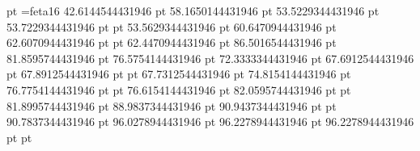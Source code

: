{{  { pt \vrule width 351.385545556806 pt depth 0.2 pt height 0.2 pt  }%
  \font\lilyfontA=feta16\lilyfontA\placebox{-20.0 pt }%
  {42.6144544431946 pt }%
  { }%
  \placebox{-24.0 pt }%
  {58.1650144431946 pt }%
  {%
   }%
  \placebox{-27.264 pt }%
  {53.5229344431946 pt }%
  {%
   }%
  \placebox{-16.0 pt }%
  {53.7229344431946 pt }%
  { pt \vrule width 0.32 pt depth 11.264 pt height 1.03836152344995 pt  }%
  \placebox{-14.0 pt }%
  {53.5629344431946 pt }%
  { }%
  \placebox{-14.0 pt }%
  {60.6470944431946 pt }%
  { }%
  \placebox{-16.0 pt }%
  {62.6070944431946 pt }%
  { pt \vrule width 0.32 pt depth 11.264 pt height 1.03836152344995 pt  }%
  \placebox{-14.0 pt }%
  {62.4470944431946 pt }%
  { }%
  \placebox{-24.0 pt }%
  {86.5016544431946 pt }%
  {%
   }%
  \placebox{-27.264 pt }%
  {81.8595744431946 pt }%
  {%
   }%
  \placebox{-27.264 pt }%
  {76.5754144431946 pt }%
  {%
   }%
  \placebox{-24.0 pt }%
  {72.3333344431946 pt }%
  {%
   }%
  \placebox{-27.264 pt }%
  {67.6912544431946 pt }%
  {%
   }%
  \placebox{-16.0 pt }%
  {67.8912544431946 pt }%
  { pt \vrule width 0.32 pt depth 11.264 pt height 1.03836152344995 pt  }%
  \placebox{-14.0 pt }%
  {67.7312544431946 pt }%
  { }%
  \placebox{-14.0 pt }%
  {74.8154144431946 pt }%
  { }%
  \placebox{-16.0 pt }%
  {76.7754144431946 pt }%
  { pt \vrule width 0.32 pt depth 11.264 pt height 1.03836152344995 pt  }%
  \placebox{-14.0 pt }%
  {76.6154144431946 pt }%
  { }%
  \placebox{-16.0 pt }%
  {82.0595744431946 pt }%
  { pt \vrule width 0.32 pt depth 11.264 pt height 1.03836152344995 pt  }%
  \placebox{-14.0 pt }%
  {81.8995744431946 pt }%
  { }%
  \placebox{-14.0 pt }%
  {88.9837344431946 pt }%
  { }%
  \placebox{-16.0 pt }%
  {90.9437344431946 pt }%
  { pt \vrule width 0.32 pt depth 11.264 pt height 1.03836152344995 pt  }%
  \placebox{-14.0 pt }%
  {90.7837344431946 pt }%
  { }%
  \placebox{-27.264 pt }%
  {96.0278944431946 pt }%
  {%
   }%
  \placebox{-24.0 pt }%
  {96.2278944431946 pt }%
  {%
   }%
  \placebox{-16.0 pt }%
  {96.2278944431946 pt }%
  { pt \vrule width 0.32 pt depth 11.264 pt height 1.03836152344995 pt  }%
}}

